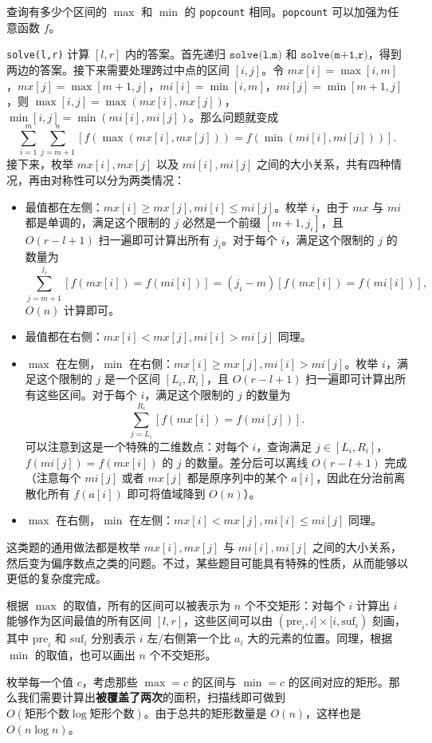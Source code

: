 \begin{example}[CF1609F]
    查询有多少个区间的 $\max$ 和 $\min$ 的 \texttt{popcount} 相同。\texttt{popcount} 可以加强为任意函数 $f$。
\end{example}
\begin{solution}
    \texttt{solve(l,r)} 计算 $[l,r]$ 内的答案。首先递归 $\texttt{solve(l,m)}$ 和 $\texttt{solve(m+1,r)}$，得到两边的答案。接下来需要处理跨过中点的区间 $[i,j]$。令 $mx[i]=\max[i,m]$，$mx[j]=\max[m+1,j]$，$mi[i]=\min[i,m]$，$mi[j]=\min[m+1,j]$，则 $\max[i,j]=\max(mx[i],mx[j])$，$\min[i,j]=\min(mi[i],mi[j])$。那么问题就变成
    $$
    \sum_{i=1}^m\sum_{j=m+1}^n [f(\max(mx[i],mx[j]))=f(\min(mi[i],mi[j]))].
    $$
    接下来，枚举 $mx[i],mx[j]$ 以及 $mi[i],mi[j]$ 之间的大小关系，共有四种情况，再由对称性可以分为两类情况：
    \begin{itemize}
        \item 最值都在左侧：$mx[i]\ge mx[j],mi[i]\le mi[j]$。枚举 $i$，由于 $mx$ 与 $mi$ 都是单调的，满足这个限制的 $j$ 必然是一个前缀 $[m+1,j_i]$，且 $O(r-l+1)$ 扫一遍即可计算出所有 $j_i$。对于每个 $i$，满足这个限制的 $j$ 的数量为
        $$
        \sum_{j=m+1}^{j_i} [f(mx[i])=f(mi[i])]=(j_i-m)[f(mx[i])=f(mi[i])],
        $$
        $O(n)$ 计算即可。
        \item 最值都在右侧：$mx[i]<mx[j],mi[i]>mi[j]$ 同理。
        \item $\max$ 在左侧，$\min$ 在右侧：$mx[i]\ge mx[j],mi[i]>mi[j]$。枚举 $i$，满足这个限制的 $j$ 是一个区间 $[L_i,R_i]$，且 $O(r-l+1)$ 扫一遍即可计算出所有这些区间。对于每个 $i$，满足这个限制的 $j$ 的数量为
        $$
        \sum_{j=L_i}^{R_i} [f(mx[i])=f(mi[j])].
        $$
        可以注意到这是一个特殊的二维数点：对每个 $i$，查询满足 $j\in[L_i,R_i]$，$f(mi[j])=f(mx[i])$ 的 $j$ 的数量。差分后可以离线 $O(r-l+1)$ 完成（注意每个 $mi[j]$ 或者 $mx[j]$ 都是原序列中的某个 $a[i]$，因此在分治前离散化所有 $f(a[i])$ 即可将值域降到 $O(n)$）。
        \item $\max$ 在右侧，$\min$ 在左侧：$mx[i]<mx[j],mi[i]\le mi[j]$ 同理。
    \end{itemize}
\end{solution}
\begin{remark}
    这类题的通用做法都是枚举 $mx[i],mx[j]$ 与 $mi[i],mi[j]$ 之间的大小关系，然后变为偏序数点之类的问题。不过，某些题目可能具有特殊的性质，从而能够以更低的复杂度完成。
\end{remark}
\begin{solution}
    根据 $\max$ 的取值，所有的区间可以被表示为 $n$ 个不交矩形：对每个 $i$ 计算出 $i$ 能够作为区间最值的所有区间 $[l,r]$，这些区间可以由 $(\mathrm{pre}_i,i]\times [i,\mathrm{suf}_i)$ 刻画，其中 $\mathrm{pre}_i$ 和 $\mathrm{suf}_i$ 分别表示 $i$ 左/右侧第一个比 $a_i$ 大的元素的位置。同理，根据 $\min$ 的取值，也可以画出 $n$ 个不交矩形。

    枚举每一个值 $c$，考虑那些 $\max=c$ 的区间与 $\min=c$ 的区间对应的矩形。那么我们需要计算出\textbf{被覆盖了两次}的面积，扫描线即可做到 $O(\text{矩形个数}\log\text{矩形个数})$。由于总共的矩形数量是 $O(n)$，这样也是 $O(n\log n)$。
\end{solution}

